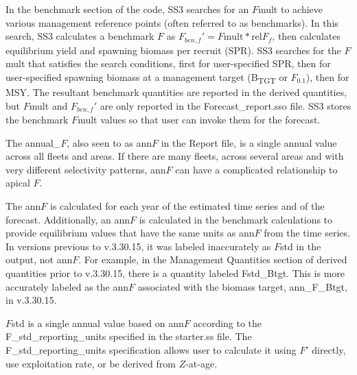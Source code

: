 In the benchmark section of the code, SS3 searches for an $F$mult to achieve various management reference points (often referred to as benchmarks). In this search, SS3 calculates a benchmark $F$ as  $F_{ben,f}' = F\text{mult} * \text{rel}F_f$, then calculates equilibrium yield and spawning biomass per recruit (SPR). SS3 searches for the $F$mult that satisfies the search conditions, first for user-specified SPR, then for user-specified spawning biomass at a management target (B\textsubscript{TGT} or $F_{0.1}$), then for MSY. The resultant benchmark quantities are reported in the derived quantities, but $F$mult and $F_{ben,f}'$ are only reported in the Forecast\_report.sso file. SS3 stores the benchmark $F$mult values so that user can invoke them for the forecast.

The annual\_$F$, also seen to as ann$F$ in the Report file, is a single annual value across all fleets and areas. If there are many fleets, across several areas and with very different selectivity patterns, ann$F$ can have a complicated relationship to apical $F$.

The ann$F$ is calculated for each year of the estimated time series and of the forecast. Additionally, an ann$F$ is calculated in the benchmark calculations to provide equilibrium values that have the same units as ann$F$ from the time series. In versions previous to v.3.30.15, it was labeled inaccurately as $F$std in the output, not ann$F$. For example, in the Management Quantities section of derived quantities prior to v.3.30.15, there is a quantity labeled Fstd\_Btgt. This is more accurately labeled as the ann$F$ associated with the biomass target, ann\_F\_Btgt, in v.3.30.15.

$F$std is a single annual value based on ann$F$ according to the F\_std\_reporting\_units specified in the starter.ss file. The F\_std\_reporting\_units specification allows user to calculate it using $F'$ directly, use exploitation rate, or be derived from $Z$-at-age.


